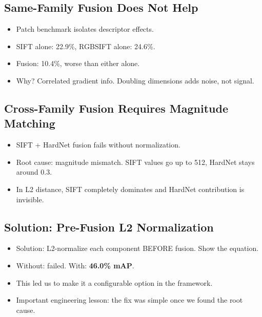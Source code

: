 \documentclass[11pt, letterpaper]{article}
\begin{document}
\subsection{Same-Family Fusion Does Not Help}
\begin{itemize}
  \item Patch benchmark isolates descriptor effects.
  \item SIFT alone: 22.9\%, RGBSIFT alone: 24.6\%.
  \item Fusion: 10.4\%, worse than either alone.
  \item Why? Correlated gradient info. Doubling dimensions adds noise, not signal.
\end{itemize}

\subsection{Cross-Family Fusion Requires Magnitude Matching}
\begin{itemize}
  \item SIFT + HardNet fusion fails without normalization.
  \item Root cause: magnitude mismatch. SIFT values go up to 512, HardNet stays around 0.3.
  \item In L2 distance, SIFT completely dominates and HardNet contribution is invisible.
\end{itemize}

\subsection{Solution: Pre-Fusion L2 Normalization}
\begin{itemize}
  \item Solution: L2-normalize each component BEFORE fusion. Show the equation.
  \item Without: failed. With: \textbf{46.0\% mAP}.
  \item This led us to make it a configurable option in the framework.
  \item Important engineering lesson: the fix was simple once we found the root cause.
\end{itemize}

\end{document}

